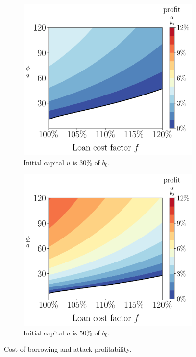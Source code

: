 \begin{figure}[htb]
  \centering
  \begin{subfigure}{0.4\textwidth}
    \includegraphics[width=\textwidth]{./figures/plotf30.pdf}
    \caption{Initial capital $u$ is $30\%$ of $b_0$.}
    \label{fig:plotf30}
  \end{subfigure}
  \hspace{10mm}
  \begin{subfigure}{0.4\textwidth}
    \includegraphics[width=\textwidth]{./figures/plotf50.pdf}
    \caption{Initial capital $u$ is $50\%$ of $b_0$.}
    \label{fig:plotf50}
  \end{subfigure}
  \caption{Cost of borrowing and attack profitability.}
  \label{fig:plotf}
\end{figure}

